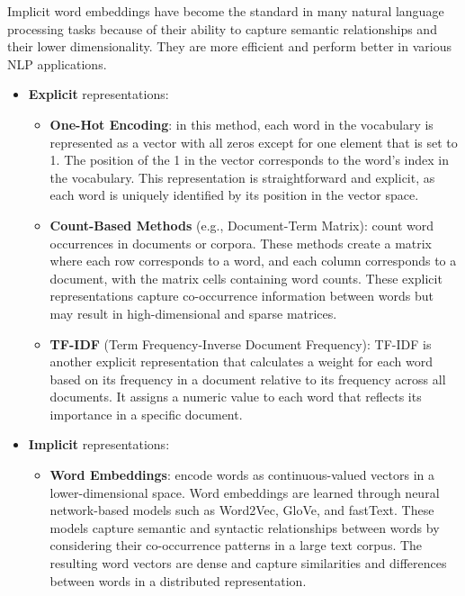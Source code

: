 \documentclass{article}
\begin{document}
Implicit word embeddings have become the standard in many natural language processing tasks because of their ability to capture semantic relationships and their lower dimensionality. They are more efficient and perform better in various NLP applications.

\newpage

\begin{itemize}
    \item \textbf{Explicit} representations:
    \begin{itemize}
        \item \textbf{One-Hot Encoding}: in this method, each word in the vocabulary is represented as a vector with all zeros except for one element that is set to 1. The position of the 1 in the vector corresponds to the word's index in the vocabulary. This representation is straightforward and explicit, as each word is uniquely identified by its position in the vector space.

        \item \textbf{Count-Based Methods} (e.g., Document-Term Matrix): count word occurrences in documents or corpora. These methods create a matrix where each row corresponds to a word, and each column corresponds to a document, with the matrix cells containing word counts. These explicit representations capture co-occurrence information between words but may result in high-dimensional and sparse matrices.

        \item \textbf{TF-IDF} (Term Frequency-Inverse Document Frequency): TF-IDF is another explicit representation that calculates a weight for each word based on its frequency in a document relative to its frequency across all documents. It assigns a numeric value to each word that reflects its importance in a specific document.
    \end{itemize}

    \item \textbf{Implicit} representations:

    \begin{itemize}
        \item \textbf{Word Embeddings}: encode words as continuous-valued vectors in a lower-dimensional space. Word embeddings are learned through neural network-based models such as Word2Vec, GloVe, and fastText. These models capture semantic and syntactic relationships between words by considering their co-occurrence patterns in a large text corpus. The resulting word vectors are dense and capture similarities and differences between words in a distributed representation.
    \end{itemize}

\end{itemize}
\end{document}
